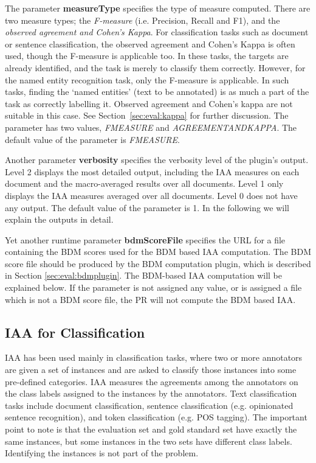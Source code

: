 The parameter {\bf measureType} specifies the type of measure computed. There are
two measure types; the {\em F-measure} (i.e. Precision, Recall and F1), and the
{\em observed agreement and Cohen's Kappa}.  For classification tasks such as
document or sentence classification, the observed agreement and Cohen's Kappa is
often used, though the F-measure is applicable too. In these tasks, the targets
are already identified, and the task is merely to classify them correctly.
However, for the named entity recognition task, only the F-measure is applicable.
In such tasks, finding the `named entities' (text to be annotated) is as much a
part of the task as correctly labelling it. Observed agreement and Cohen's kappa
are not suitable in this case. See Section~\ref{sec:eval:kappa} for further
discussion. The parameter has two values, {\em FMEASURE} and {\em
AGREEMENTANDKAPPA}. The default value of the parameter is {\em FMEASURE}.

Another parameter {\bf verbosity} specifies the verbosity level of the
plugin's output. Level 2 displays the most detailed output, including
the IAA measures on each document and the macro-averaged results over
all documents.  Level 1 only displays the IAA measures averaged over
all documents.  Level 0 does not have any output. The default value of
the parameter is 1.  In the following we will explain the outputs in
detail.

Yet another runtime parameter {\bf bdmScoreFile} specifies the URL for
a file containing the BDM scores used for the BDM based IAA
computation. The BDM score file should be produced by the BDM
computation plugin, which is described in
Section \ref{sec:eval:bdmplugin}. The BDM-based IAA computation will be
explained below.  If the parameter is not assigned any value, or is
assigned a file which is not a BDM score file, the PR will not compute the
BDM based IAA.

\subsection{IAA for Classification}

IAA has been used mainly in classification tasks, where two or more annotators
are given a set of instances and are asked to classify those instances into some
pre-defined categories. IAA measures the agreements among the annotators on the
class labels assigned to the instances by the annotators. Text classification
tasks include document classification, sentence classification (e.g. opinionated
sentence recognition), and token classification (e.g. POS tagging). The important
point to note is that the evaluation set and gold standard set have exactly the
same instances, but some instances in the two sets have different class labels.
Identifying the instances is not part of the problem.

